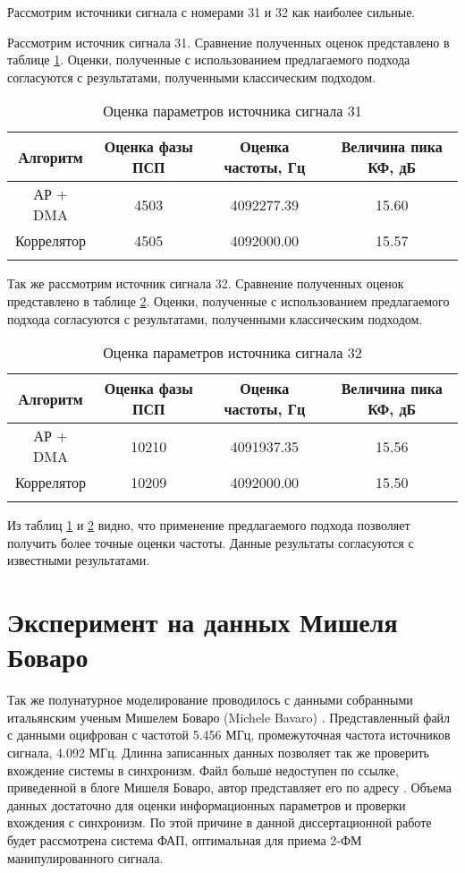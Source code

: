 Рассмотрим источники сигнала с номерами 31 и 32 как наиболее сильные.

Рассмотрим источник сигнала 31. Сравнение полученных оценок представлено в таблице \ref{tbl:16mhz_sat_31}. Оценки, полученные с использованием
предлагаемого подхода согласуются с результатами, полученными классическим подходом.
\begin{center}
	\begin{longtable}{ | c | c | c | c |}
	\hline
	Алгоритм	& Оценка фазы ПСП & Оценка частоты, Гц & Величина пика КФ, дБ \\ \hline
	АР + DMA	& 4503 & 4092277.39	& 15.60 \\ \hline
	Коррелятор & 4505 & 4092000.00	& 15.57 \\ \hline
	\caption{Оценка параметров источника сигнала 31}
	\label{tbl:16mhz_sat_31}
	\end{longtable}
\end{center}

Так же рассмотрим источник сигнала 32.  Сравнение полученных оценок представлено в таблице \ref{tbl:16mhz_sat_32}. Оценки, полученные с использованием
предлагаемого подхода согласуются с результатами, полученными классическим подходом.
\begin{center}
	\begin{longtable}{ | c | c | c | c |}
	\hline
	Алгоритм	& Оценка фазы ПСП & Оценка частоты, Гц & Величина пика КФ, дБ \\ \hline
	АР + DMA	& 10210 & 4091937.35	& 15.56 \\ \hline
	Коррелятор	& 10209 & 4092000.00   	& 15.50 \\ \hline
	\caption{Оценка параметров источника сигнала 32}
	\label{tbl:16mhz_sat_32}
	\end{longtable}
\end{center}

Из таблиц \ref{tbl:16mhz_sat_31} и \ref{tbl:16mhz_sat_32} видно, что применение предлагаемого подхода позволяет получить более точные оценки частоты. Данные
результаты согласуются с известными результатами.

\section{Эксперимент на данных Мишеля Боваро}

Так же полунатурное моделирование проводилось с данными собранными итальянским ученым Мишелем Боваро (Michele Bavaro) \cite{bovaro_blog}. Представленный файл с данными оцифрован
с частотой 5.456 МГц, промежуточная частота источников сигнала, 4.092 МГц. Длинна записанных данных позволяет так же проверить
вхождение системы в синхронизм. Файл больше недоступен по ссылке, приведенной в блоге Мишеля Боваро, автор представляет его по адресу \cite{rflab_primo}.
Объема данных достаточно для оценки информационных параметров и проверки вхождения с синхронизм. По этой причине в данной диссертационной работе будет
рассмотрена система ФАП, оптимальная для приема 2-ФМ манипулированного сигнала.

